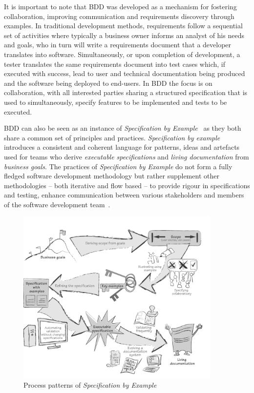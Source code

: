 \documentclass[dissertation,final]{softeng}
\begin{document}
It is important to note that BDD was developed as a mechanism for fostering collaboration, improving communication and requirements discovery through examples. In traditional development methods, requirements follow a sequential set of activities where typically a business owner informs an analyst of his needs and goals, who in turn will write a requirements document that a developer translates into software. Simultaneously, or upon completion of development, a tester translates the same requirements document into test cases which, if executed with success, lead to user and technical documentation being produced and the software being deployed to end-users. In BDD the focus is on collaboration, with all interested parties sharing a structured specification that is used to simultaneously, specify features to be implemented and tests to be executed.

BDD can also be seen as an instance of \emph{Specification by Example}~\citep{Adzic201106} as they both share a common set of principles and practices. \emph{Specification by example} introduces a consistent and coherent language for patterns, ideas and artefacts used for teams who derive \emph{executable specifications} and \emph{living documentation} from \emph{business goals}. The practices of \emph{Specification by Example} do not form a fully fledged software development methodology but rather supplement other methodologies -- both iterative and flow based -- to provide rigour in specifications and testing, enhance communication between various stakeholders and members of the software development team~\citep{Adzic201106}.

\begin{figure}[h]
\includegraphics[width=0.9\textwidth]{SpecificationbyExample}
\centering
\caption[Specification by Example]{Process patterns of \emph{Specification by Example}~\citep{Adzic201106}}
\label{fig:specification_by_example}
\end{figure}
\end{document}
